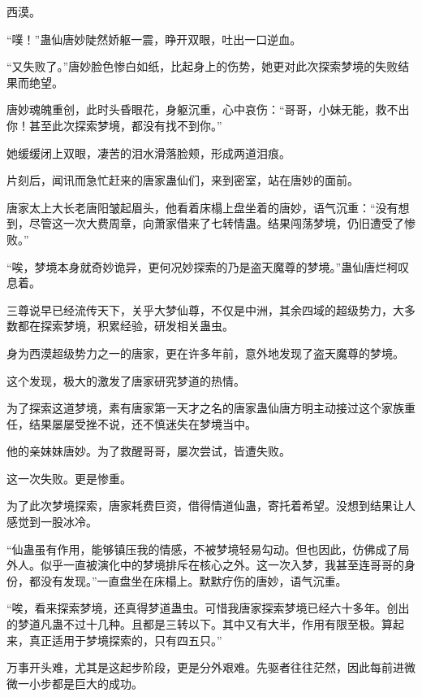 
\begin{this_body}



西漠。

“噗！”蛊仙唐妙陡然娇躯一震，睁开双眼，吐出一口逆血。

“又失败了。”唐妙脸色惨白如纸，比起身上的伤势，她更对此次探索梦境的失败结果而绝望。

唐妙魂魄重创，此时头昏眼花，身躯沉重，心中哀伤：“哥哥，小妹无能，救不出你！甚至此次探索梦境，都没有找不到你。”

她缓缓闭上双眼，凄苦的泪水滑落脸颊，形成两道泪痕。

片刻后，闻讯而急忙赶来的唐家蛊仙们，来到密室，站在唐妙的面前。

唐家太上大长老唐阳皱起眉头，他看着床榻上盘坐着的唐妙，语气沉重：“没有想到，尽管这一次大费周章，向萧家借来了七转情蛊。结果闯荡梦境，仍旧遭受了惨败。”

“唉，梦境本身就奇妙诡异，更何况妙探索的乃是盗天魔尊的梦境。”蛊仙唐烂柯叹息着。

三尊说早已经流传天下，关乎大梦仙尊，不仅是中洲，其余四域的超级势力，大多数都在探索梦境，积累经验，研发相关蛊虫。

身为西漠超级势力之一的唐家，更在许多年前，意外地发现了盗天魔尊的梦境。

这个发现，极大的激发了唐家研究梦道的热情。

为了探索这道梦境，素有唐家第一天才之名的唐家蛊仙唐方明主动接过这个家族重任，结果屡屡受挫不说，还不慎迷失在梦境当中。

他的亲妹妹唐妙。为了救醒哥哥，屡次尝试，皆遭失败。

这一次失败。更是惨重。

为了此次梦境探索，唐家耗费巨资，借得情道仙蛊，寄托着希望。没想到结果让人感觉到一股冰冷。

“仙蛊虽有作用，能够镇压我的情感，不被梦境轻易勾动。但也因此，仿佛成了局外人。似乎一直被演化中的梦境排斥在核心之外。这一次入梦，我甚至连哥哥的身份，都没有发现。”一直盘坐在床榻上。默默疗伤的唐妙，语气沉重。

“唉，看来探索梦境，还真得梦道蛊虫。可惜我唐家探索梦境已经六十多年。创出的梦道凡蛊不过十几种。且都是三转以下。其中又有大半，作用有限至极。算起来，真正适用于梦境探索的，只有四五只。”

万事开头难，尤其是这起步阶段，更是分外艰难。先驱者往往茫然，因此每前进微微一小步都是巨大的成功。


\end{this_body}
